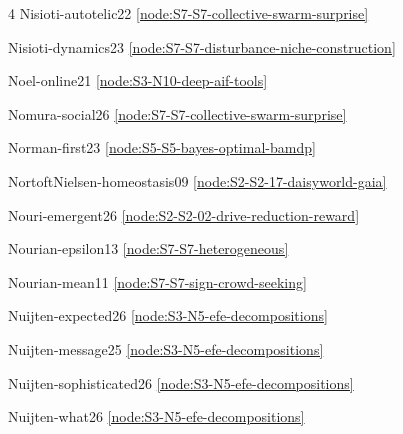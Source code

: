 \documentclass[10pt]{article}
\begin{document}
{\begin{multicols}{4}
Nisioti-autotelic22 \hfill \ref{node:S7-S7-collective-swarm-surprise}\par
Nisioti-dynamics23 \hfill \ref{node:S7-S7-disturbance-niche-construction}\par
Noel-online21 \hfill \ref{node:S3-N10-deep-aif-tools}\par
Nomura-social26 \hfill \ref{node:S7-S7-collective-swarm-surprise}\par
Norman-first23 \hfill \ref{node:S5-S5-bayes-optimal-bamdp}\par
NortoftNielsen-homeostasis09 \hfill \ref{node:S2-S2-17-daisyworld-gaia}\par
Nouri-emergent26 \hfill \ref{node:S2-S2-02-drive-reduction-reward}\par
Nourian-epsilon13 \hfill \ref{node:S7-S7-heterogeneous}\par
Nourian-mean11 \hfill \ref{node:S7-S7-sign-crowd-seeking}\par
Nuijten-expected26 \hfill \ref{node:S3-N5-efe-decompositions}\par
Nuijten-message25 \hfill \ref{node:S3-N5-efe-decompositions}\par
Nuijten-sophisticated26 \hfill \ref{node:S3-N5-efe-decompositions}\par
Nuijten-what26 \hfill \ref{node:S3-N5-efe-decompositions}\par


\end{multicols}}
\end{document}
